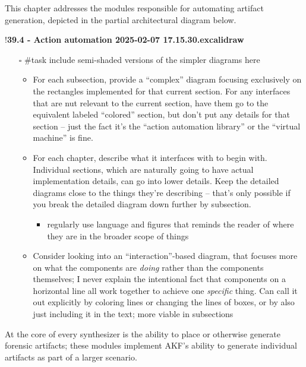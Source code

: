 This chapter addresses the modules responsible for automating artifact
generation, depicted in the partial architectural diagram below.

!\textbf{39.4 - Action automation 2025-02-07 17.15.30.excalidraw}

\begin{itemize}
\tightlist
\item[$\square$]
  \#task include semi-shaded versions of the simpler diagrams here

  \begin{itemize}
  \tightlist
  \item
    For each subsection, provide a ``complex'' diagram focusing
    exclusively on the rectangles implemented for that current section.
    For any interfaces that are nut relevant to the current section,
    have them go to the equivalent labeled ``colored'' section, but
    don't put any details for that section -- just the fact it's the
    ``action automation library'' or the ``virtual machine'' is fine.
  \item
    For each chapter, describe what it interfaces with to begin with.
    Individual sections, which are naturally going to have actual
    implementation details, can go into lower details. Keep the detailed
    diagrams close to the things they're describing -- that's only
    possible if you break the detailed diagram down further by
    subsection.

    \begin{itemize}
    \tightlist
    \item
      regularly use language and figures that reminds the reader of
      where they are in the broader scope of things
    \end{itemize}
  \item
    Consider looking into an ``interaction''-based diagram, that focuses
    more on what the components are \emph{doing} rather than the
    components themselves; I never explain the intentional fact that
    components on a horizontal line all work together to achieve one
    \emph{specific} thing. Can call it out explicitly by coloring lines
    or changing the lines of boxes, or by also just including it in the
    text; more viable in subsections
  \end{itemize}
\end{itemize}

At the core of every synthesizer is the ability to place or otherwise
generate forensic artifacts; these modules implement AKF's ability to
generate individual artifacts as part of a larger scenario.

